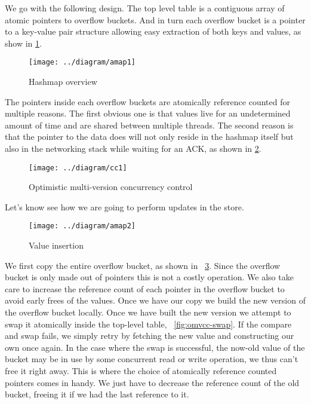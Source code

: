 \documentclass[11pt]{article}
\begin{document}
We go with the following design. The top level table is a contiguous
array of atomic pointers to overflow buckets. And in turn each
overflow bucket is a pointer to a key-value pair structure allowing
easy extraction of both keys and values, as show in \ref{fig:hashmap}.

\begin{figure}[h!]
  \texttt{[image: ../diagram/amap1]}
  \caption{Hashmap overview}
  \label{fig:hashmap}
\end{figure}

The pointers inside each overflow buckets are atomically reference
counted for multiple reasons. The first obvious one is that values
live for an undetermined amount of time and are shared between
multiple threads. The second reason is that the pointer to the data
does will not only reside in the hashmap itself but also in the
networking stack while waiting for an ACK, as shown in
\ref{fig:omvcc}.

\begin{figure}[h!]
  \texttt{[image: ../diagram/cc1]}
  \caption{Optimistic multi-version concurrency control}
  \label{fig:omvcc}
\end{figure}

Let's know see how we are going to perform updates in the store.

\begin{figure}[h!]
  \texttt{[image: ../diagram/amap2]}
  \caption{Value insertion}
  \label{fig:omvcc-insert}
\end{figure}

We first copy the entire overflow bucket, as shown in
~\ref{fig:omvcc-insert}. Since the overflow bucket is only made out of
pointers this is not a costly operation. We also take care to increase
the reference count of each pointer in the overflow bucket to avoid
early frees of the values. Once we have our copy we build the new
version of the overflow bucket locally. Once we have built the new
version we attempt to swap it atomically inside the top-level
table, ~\ref{fig:omvcc-swap}. If the compare and swap fails, we simply
retry by fetching the new value and constructing our own once
again. In the case where the swap is successful, the now-old value of
the bucket may be in use by some concurrent read or write operation,
we thus can't free it right away. This is where the choice of
atomically reference counted pointers comes in handy. We just have to
decrease the reference count of the old bucket, freeing it if we had
the last reference to it.
\end{document}
